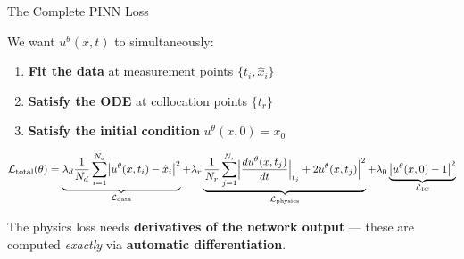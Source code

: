 \documentclass[aspectratio=169,xcolor=dvipsnames,svgnames,x11names,fleqn]{beamer}
\begin{document}
\begin{frame}{The Complete PINN Loss}

We want $u^\theta(x, t)$ to simultaneously:

\begin{enumerate}
  \item \textbf{Fit the data} at measurement points $\{t_i, \hat{x}_i\}$
  \item \textbf{Satisfy the ODE} at collocation points $\{t_r\}$
  \item \textbf{Satisfy the initial condition} $u^\theta(x, 0) = x_0$
\end{enumerate}

\vspace{10pt}
\begin{tcolorbox}[    enhanced,
    colback=androidRedLight,
    colframe=borderLine,
    arc=0pt, 
    boxrule=0.3pt,
    leftrule=3pt,
    borderline west={5pt}{0pt}{accentOrange}, 
    fontupper=\color{boxBackground},
    pad at break*=0mm,
    top=5pt, bottom=5pt, left=5pt, right=5pt]
    \small
$$
\mathcal{L}_\text{total}(\theta) = 
  \underbrace{\lambda_{d}\frac{1}{N_d}\sum_{i=1}^{N_d}\bigl|u^\theta(x, t_i) - \hat{x}_i\bigr|^2}_{\mathcal{L}_\text{data}}
  + \lambda_r\underbrace{\frac{1}{N_r}\sum_{j=1}^{N_r}\Bigl|\frac{du^\theta(x, t_j)}{dt}\Big|_{t_j} + 2u^\theta(x, t_j)\Bigr|^2}_{\mathcal{L}_\text{physics}}
  + \lambda_0\underbrace{\bigl|u^\theta(x, 0) - 1\bigr|^2}_{\mathcal{L}_\text{IC}}
$$
\end{tcolorbox}

\vspace{5pt}
\pause
\begin{center}
\color{DarkBlue}
The physics loss needs \textbf{derivatives of the network output} — these are computed \textit{exactly} via \textbf{automatic differentiation}.
\end{center}
\end{frame}
\end{document}

